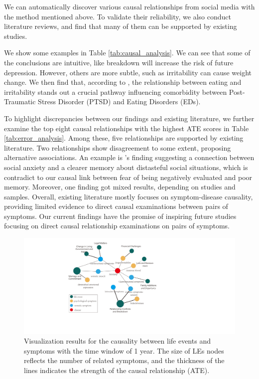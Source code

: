 We can automatically discover various causal relationships from social media with the method mentioned above. To validate their reliability, we also conduct literature reviews, and find that many of them can be supported by existing studies. 

We show some examples in Table \ref{tab:causal_analysis}. We can see that some of the conclusions are intuitive, like breakdown will increase the risk of future depression. However, others are more subtle, such as irritability can cause weight change. We then find that, according to \citet{vanzhula2019illness}, the relationship between eating and irritability stands out a crucial pathway influencing comorbidity between Post-Traumatic Stress Disorder (PTSD) and Eating Disorders (EDs). 

To highlight discrepancies between our findings and existing literature, we further examine the top eight causal relationships with the highest ATE scores in Table \ref{tab:error_analysis}.
Among these, five relationships are supported by existing literature. Two relationships show disagreement to some extent, proposing alternative associations. An example is \citet{seinsche2023memory}'s finding suggesting a connection between social anxiety and a clearer memory about distasteful social situations, which is contradict to our causal link between fear of being negatively evaluated and poor memory. Moreover, one finding got mixed results, depending on studies and samples.
Overall, existing literature mostly focuses on symptom-disease causality, providing limited evidence to direct causal examinations between pairs of symptoms. Our current findings have the promise of inspiring future studies focusing on direct causal relationship examinations on pairs of symptoms.


\begin{figure}[h]
	\centering
	\includegraphics[width=\linewidth]{figures/ate_syp_365.pdf}
	\caption{Visualization results for the causality between life events and symptoms with the time window of 1 year. The size of LEs nodes reflects the number of related symptoms, and the thickness of the lines indicates the strength of the causal relationship (ATE).}
	\label{fig:LEs_symps_disease}
\end{figure}


